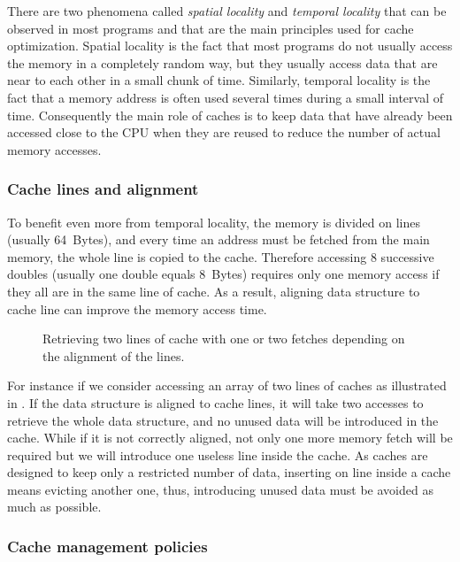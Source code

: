 There are two phenomena called \emph{spatial locality} and \emph{temporal locality} that can be observed in most programs and that are the main principles used for cache optimization.
Spatial locality is the fact that most programs do not usually access the memory in a completely random way, but they usually access data that are near to each other in a small chunk of time.
Similarly, temporal locality is the fact that a memory address is often used several times during a small interval of time.
Consequently the main role of caches is to keep data that have already been accessed close to the \gls{CPU} when they are reused to reduce the number of actual memory accesses.

\subsubsection{Cache lines and alignment}

To benefit even more from temporal locality, the memory is divided on lines (usually \SI{64}{Bytes}), and every time an address must be fetched from the main memory, the whole line is copied to the cache.
Therefore accessing $8$ successive doubles (usually one double equals \SI{8}{Bytes}) requires only one memory access if they all are in the same line of cache.
As a result, aligning data structure to cache line can improve the memory access time.

\begin{figure}[htb]
    \centering
    
    \caption[Example of bad alignment.]{Retrieving two lines of cache with one or two fetches depending on the alignment of the lines.}
    \label{fig:bad-align}
\end{figure}

For instance if we consider accessing an array of two lines of caches as illustrated in .
If the data structure is aligned to cache lines, it will take two accesses to retrieve the whole data structure, and no unused data will be introduced in the cache.
While if it is not correctly aligned, not only one more memory fetch will be required but we will introduce one useless line inside the cache.
As caches are designed to keep only a restricted number of data, inserting on line inside a cache means evicting another one, thus, introducing unused data must be avoided as much as possible.

\subsubsection{Cache management policies}

